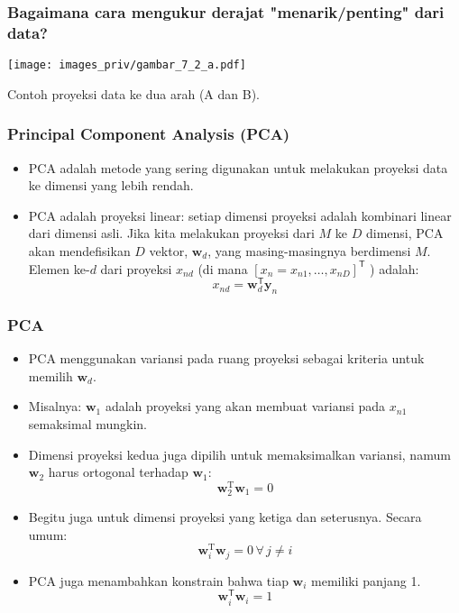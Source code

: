 \documentclass[bahasa,11pt,aspectratio=169]{beamer}
\begin{document}
\begin{frame}
\frametitle{Bagaimana cara mengukur derajat "menarik/penting" dari data?}

\begin{center}
\texttt{[image: images\_priv/gambar\_7\_2\_a.pdf]}
\end{center}

Contoh proyeksi data ke dua arah (A dan B).

\end{frame}



\begin{frame}
\frametitle{Principal Component Analysis (PCA)}

\begin{itemize}
\item PCA adalah metode yang sering digunakan untuk melakukan proyeksi data ke dimensi
yang lebih rendah.
\item PCA adalah proyeksi linear: setiap dimensi proyeksi adalah kombinari linear dari
dimensi asli. Jika kita melakukan proyeksi dari $M$ ke $D$ dimensi, PCA akan mendefisikan
$D$ vektor, $\mathbf{w}_{d}$, yang masing-masingnya berdimensi $M$. Elemen ke-$d$ dari
proyeksi $x_{nd}$ (di mana $[x_{n} = x_{n1},\ldots,x_{nD}]^{\mathsf{T}}$ ) adalah:
$$
x_{nd} = \mathbf{w}^{\mathsf{T}}_{d} \mathbf{y}_{n}
$$
\end{itemize}

\end{frame}


\begin{frame}
\frametitle{PCA}

\begin{itemize}
\item PCA menggunakan variansi pada ruang proyeksi sebagai kriteria untuk memilih
$\mathbf{w}_{d}$.
%
\item Misalnya: $\mathbf{w}_{1}$ adalah proyeksi yang akan membuat variansi pada $x_{n1}$ semaksimal mungkin.
%
\item Dimensi proyeksi kedua juga dipilih untuk memaksimalkan variansi, namum $\mathbf{w}_{2}$
harus ortogonal terhadap $\mathbf{w}_{1}$:
$$
\mathbf{w}_{2}^{\mathrm{T}} \mathbf{w}_{1} = 0
$$
%
\item Begitu juga untuk dimensi proyeksi yang ketiga dan seterusnya. Secara umum:
$$
\mathbf{w}_{i}^{\mathrm{T}} \mathbf{w}_{j} = 0 \, \forall\, j \neq i
$$
\item PCA juga menambahkan konstrain bahwa tiap $\mathbf{w}_{i}$ memiliki panjang 1.
$$
\mathbf{w}_{i}^{\mathsf{T}} \mathbf{w}_{i} = 1
$$

\end{itemize}

\end{frame}
\end{document}
